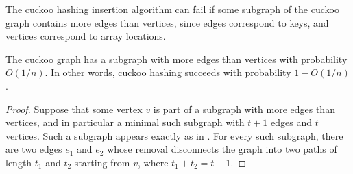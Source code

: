 \documentclass{patmorin}
\begin{document}
The cuckoo hashing insertion algorithm can fail if some subgraph of
the cuckoo graph contains more edges than vertices, since edges
correspond to keys, and vertices correspond to array locations.
\begin{lem}
  The cuckoo graph has a subgraph with more edges than vertices with
  probability $O(1/n)$. In other words, cuckoo hashing succeeds with
  probability $1 - O(1/n)$.
\end{lem}
\begin{proof}
  Suppose that some vertex $v$ is part of a subgraph with more edges
  than vertices, and in particular a minimal such subgraph with $t +
  1$ edges and $t$ vertices. Such a subgraph appears exactly as in
  . For every such subgraph, there are two edges
  $e_1$ and $e_2$ whose removal disconnects the graph into two paths
  of length $t_1$ and $t_2$ starting from $v$, where $t_1 + t_2 = t -
  1$.


\end{proof}
\end{document}
